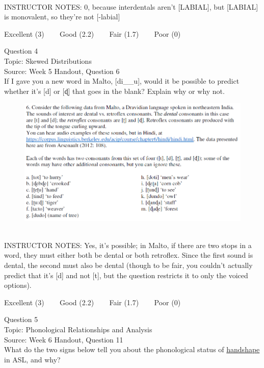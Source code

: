 \documentclass[12pt]{article}
\begin{document}
~\\
INSTRUCTOR NOTES: 0, because interdentals aren't [LABIAL], but [LABIAL] is monovalent, so they're not [-labial]


\vfill
Excellent (3) ~~~ Good (2.2) ~~~ Fair (1.7) ~~~ Poor (0)
\newpage

{\large Question 4}\\

Topic: Skewed Distributions\\
Source: Week 5 Handout, Question 6\\

If I gave you a new word in Malto, [di\_\_u], would it be possible to predict whether it's [d] or [ɖ] that goes in the blank? Explain why or why not.\\

\begin{figure}[H]
\includegraphics{../images/malto.png}
\end{figure}

~\\
INSTRUCTOR NOTES: Yes, it's possible; in Malto, if there are two stops in a word, they must either both be dental or both retroflex. Since the first sound is dental, the second must also be dental (though to be fair, you couldn't actually predict that it's [d] and not [t], but the question restricts it to only the voiced options).


\vfill
Excellent (3) ~~~ Good (2.2) ~~~ Fair (1.7) ~~~ Poor (0)
\newpage

{\large Question 5}\\

Topic: Phonological Relationships and Analysis\\
Source: Week 6 Handout, Question 11\\

What do the two signs below tell you about the phonological status of \underline{handshape} in ASL, and why?\\
\end{document}
